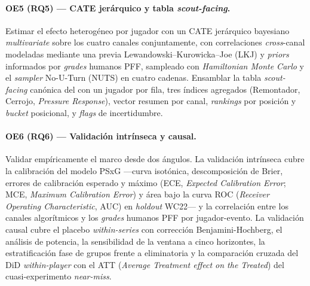 \paragraph{OE5 (RQ5) --- CATE jerárquico y tabla \textit{scout-facing}.}
Estimar el efecto heterogéneo por jugador con un CATE jerárquico bayesiano
\textit{multivariate} sobre los cuatro canales conjuntamente, con
correlaciones \textit{cross}-canal modeladas mediante una previa
Lewandowski--Kurowicka--Joe (LKJ) y \textit{priors} informados por
\textit{grades} humanos PFF, sampleado con \textit{Hamiltonian Monte
Carlo} y el \textit{sampler} No-U-Turn (NUTS) en cuatro cadenas. Ensamblar
la tabla \textit{scout-facing} canónica del \CCV con un jugador por fila,
tres índices agregados (Remontador, Cerrojo, \textit{Pressure Response}),
vector resumen por canal, \textit{rankings} por posición y \textit{bucket}
posicional, y \textit{flags} de incertidumbre.

\paragraph{OE6 (RQ6) --- Validación intrínseca y causal.}
Validar empíricamente el marco desde dos ángulos. La validación intrínseca
cubre la calibración del modelo PSxG ---curva isotónica,
descomposición de Brier, errores de calibración esperado y máximo
(ECE, \textit{Expected Calibration Error}; MCE, \textit{Maximum
Calibration Error}) y área bajo la curva ROC (\textit{Receiver Operating
Characteristic}, AUC) en \textit{holdout} WC22--- y la
correlación entre los canales algorítmicos y los \textit{grades} humanos
PFF por jugador-evento. La validación causal cubre el placebo
\textit{within-series} con corrección Benjamini-Hochberg, el análisis de
potencia, la sensibilidad de la ventana a cinco horizontes, la
estratificación fase de grupos frente a eliminatoria y la comparación
cruzada del DiD \textit{within-player} con el ATT (\textit{Average
Treatment effect on the Treated}) del cuasi-experimento
\textit{near-miss}.
